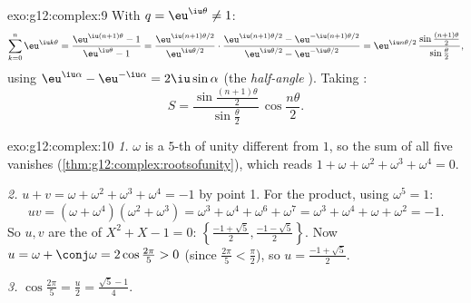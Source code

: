 \begin{solution}{exo:g12:complex:9}
With $q = \eu^{\iu\theta} \neq 1$:
\[
\sum_{k=0}^{n} \eu^{\iu k\theta} = \frac{\eu^{\iu(n+1)\theta} - 1}{\eu^{\iu\theta} - 1}
= \frac{\eu^{\iu(n+1)\theta/2}}{\eu^{\iu\theta/2}}
\cdot\frac{\eu^{\iu(n+1)\theta/2} - \eu^{-\iu(n+1)\theta/2}}{\eu^{\iu\theta/2} - \eu^{-\iu\theta/2}}
= \eu^{\iu n\theta/2}\,
\frac{\sin\frac{(n+1)\theta}{2}}{\sin\frac{\theta}{2}},
\]
using $\eu^{\iu\alpha} - \eu^{-\iu\alpha} = 2\iu\sin\alpha$ (the
\emph{half-angle }). Taking :
\[
S = \frac{\sin\frac{(n+1)\theta}{2}}{\sin\frac{\theta}{2}}\,
\cos\frac{n\theta}{2}.
\]
\end{solution}

\begin{solution}{exo:g12:complex:10}
\emph{1.} $\omega$ is a $5$-th  of unity different from $1$, so the sum
of all five  vanishes (\cref{thm:g12:complex:rootsofunity}), which reads
$1 + \omega + \omega^2 + \omega^3 + \omega^4 = 0$.

\emph{2.} $u + v = \omega + \omega^2 + \omega^3 + \omega^4 = -1$ by point 1.
For the product, using $\omega^5 = 1$:
\[
uv = (\omega + \omega^4)(\omega^2 + \omega^3)
= \omega^3 + \omega^4 + \omega^6 + \omega^7
= \omega^3 + \omega^4 + \omega + \omega^2 = -1 .
\]
So $u, v$ are the  of $X^2 + X - 1 = 0$:
$\left\{\frac{-1+\sqrt5}{2}, \frac{-1-\sqrt5}{2}\right\}$. Now
$u = \omega + \conj\omega = 2\cos\frac{2\pi}{5} > 0$ (since
$\frac{2\pi}{5} < \frac{\pi}{2}$), so $u = \frac{-1 + \sqrt5}{2}$.

\emph{3.} $\cos\frac{2\pi}{5} = \frac u2 = \frac{\sqrt5 - 1}{4}$.
\end{solution}


